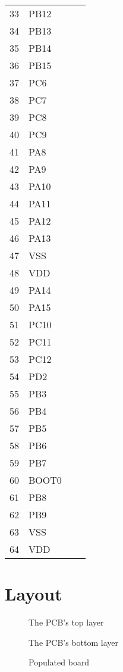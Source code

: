 \documentclass[12pt,fleqn,parskip=half,twoside,toc=index,headings=small,a4paper]{scrreprt}
\begin{document}
\begin{table}[H]
\begin{minipage}{.48\linewidth}
\begin{tabularx}{\linewidth}{@{}rllX@{}}
			\midrule
			33 	& PB12 \\
			34 	& PB13 &  \\
			35 	& PB14 &  \\
			36	& PB15 & \\
			37 	& PC6 & \\
			38 	& PC7 & \\
			39 	& PC8 & \\
			40 	& PC9 & \\
			41 	& PA8 &  \\ 
			42	& PA9 &  \\
			43	& PA10 & \\
			44  & PA11\\
			45  & PA12 & \\
			46  & PA13 & \\
			47  & VSS & \\
			48  & VDD & \\ 
			\midrule
			49  & PA14 & \\
			50  & PA15 & \\ 
			51  & PC10 & \\ 
			52  & PC11 & \\ 
			53  & PC12 & \\ 
			54  & PD2 & \\ 
			55  & PB3 & \\
			56  & PB4 & \\ 
			57  & PB5 & \\ 
			58  & PB6\\ 
			59  & PB7 & \\ 
			60  & BOOT0 \\
			61  & PB8 & \\
			62  & PB9 & \\
			63  & VSS & \\
			64  & VDD & \\ 			
			\bottomrule
		\end{tabularx}%
	\end{minipage}
\end{table}
	\section{Layout}
	\begin{figure}[h]
		\centering
		\caption{The PCB's top layer}
	\end{figure}
	\begin{figure}[h]
		\centering
		\caption{The PCB's bottom layer}
	\end{figure}
	\begin{figure}[h]
		\centering
		\caption{Populated board}
	\end{figure}
%
\end{document}
